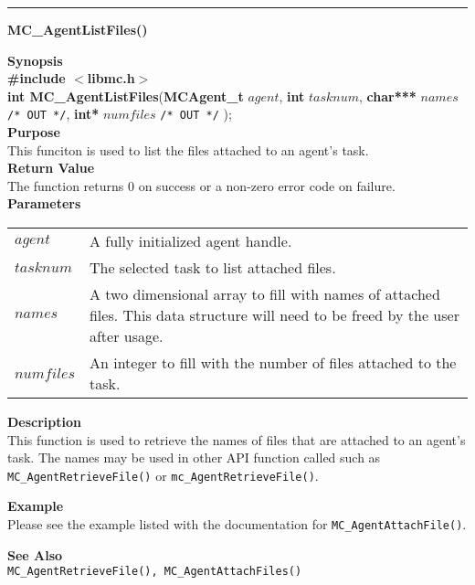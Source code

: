 \noindent
\vspace{5pt}
\rule{6.5in}{0.015in}
\noindent
{}
{\LARGE \bf MC\_AgentListFiles()}\\

\noindent
{\bf Synopsis}\\
{\bf \#include $<$libmc.h$>$}\\
{\bf int MC\_AgentListFiles}({\bf MCAgent\_t} $agent$, 
                                  {\bf int} $tasknum$,
                                  {\bf char***} $names$ \texttt{/* OUT */},
                                  {\bf int*} $numfiles$ \texttt{/* OUT */}
																	);\\

\noindent
{\bf Purpose}\\
This funciton is used to list the files attached to an agent's task.\\

\noindent
{\bf Return Value}\\
The function returns 0 on success or a non-zero error code on failure.\\

\noindent
{\bf Parameters}
\vspace{-0.1in}
\begin{description}
\item
\begin{tabular}{p{30 mm}p{125 mm}} 
$agent$ & A fully initialized agent handle.\\
$tasknum$ & The selected task to list attached files.\\
$names$ & A two dimensional array to fill with names of attached files. This
data structure will need to be freed by the user after usage.\\
$numfiles$ & An integer to fill with the number of files attached to the task.
\end{tabular}
\end{description}

\noindent
{\bf Description}\\
This function is used to retrieve the names of files that are attached to an
agent's task. The names may be used in other API function called such as
\texttt{MC\_AgentRetrieveFile()} or \texttt{mc\_AgentRetrieveFile()}.

\noindent
{\bf Example}\\
\noindent
Please see the example listed with the documentation for
\texttt{MC\_AgentAttachFile()}.

\noindent
{\bf See Also}\\
\texttt{MC\_AgentRetrieveFile(), MC\_AgentAttachFiles()}

